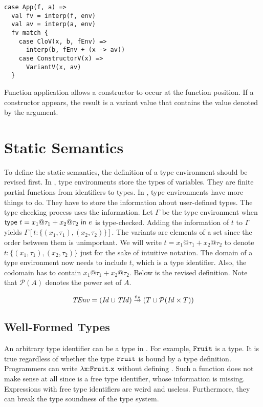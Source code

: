 \begin{verbatim}
case App(f, a) =>
  val fv = interp(f, env)
  val av = interp(a, env)
  fv match {
    case CloV(x, b, fEnv) =>
      interp(b, fEnv + (x -> av))
    case ConstructorV(x) =>
      VariantV(x, av)
  }
\end{verbatim}

Function application allows a constructor to occur at the function position.
If a constructor appears, the result is a variant value that
contains the value denoted by the argument.

\section{Static Semantics}

To define the static semantics, the definition of a type environment should be
revised first. In \plang, type environments store the types of variables. They
are finite partial functions from identifiers to types. In \Lang, type environments
have more things to do. They have to store the information about user-defined types.
The type checking process uses the information. Let $\Gamma$ be the type
environment when $\textsf{type}\ t=x_1@\tau_1+x_2@\tau_2\ \textsf{in}\ e$ is
type-checked. Adding the information of $t$ to $\Gamma$ yields
$\Gamma[t:\{(x_1,\tau_1),(x_2,\tau_2)\}]$. The variants are elements of a set
since the order between them is unimportant. We will write
$t=x_1@\tau_1+x_2@\tau_2$ to denote $t:\{(x_1,\tau_1),(x_2,\tau_2)\}$ just for
the sake of intuitive notation.
The domain of a type environment now needs to include $t$, which is
a type identifier. Also, the codomain has to contain $x_1@\tau_1+x_2@\tau_2$.
Below is the revised definition. Note that $\mathcal{P}(A)$ denotes the power set
of $A$.

\[
  \embox{TEnv}=
(\embox{Id}\cup\embox{TId})\finto
(T\cup\mathcal{P}(\embox{Id}\times T))
\]

\subsection{Well-Formed Types}

An arbitrary type identifier can be a type in \Lang. For example, $\texttt{Fruit}$ is a
type. It is true regardless of whether the type $\texttt{Fruit}$ is bound by a type
definition. Programmers can write $\lambda\texttt{x}{:}\texttt{Fruit}.\texttt{x}$ without defining
. Such a function does not make sense at all since  is a
free type identifier, whose information is missing. Expressions with free type
identifiers are weird and useless. Furthermore, they can break the type soundness of the
type system.

